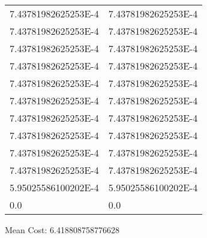 \documentclass[12pt]{article}
\begin{document}
\begin{tabular}{l l}
7.43781982625253E-4	&	7.43781982625253E-4\\
7.43781982625253E-4	&	7.43781982625253E-4\\
7.43781982625253E-4	&	7.43781982625253E-4\\
7.43781982625253E-4	&	7.43781982625253E-4\\
7.43781982625253E-4	&	7.43781982625253E-4\\
7.43781982625253E-4	&	7.43781982625253E-4\\
7.43781982625253E-4	&	7.43781982625253E-4\\
7.43781982625253E-4	&	7.43781982625253E-4\\
7.43781982625253E-4	&	7.43781982625253E-4\\
7.43781982625253E-4	&	7.43781982625253E-4\\
5.95025586100202E-4	&	5.95025586100202E-4\\
0.0	&	0.0\\
\end{tabular}\newpage
\noindent
\noindent Mean Cost: 6.418808758776628\\
\end{document}
